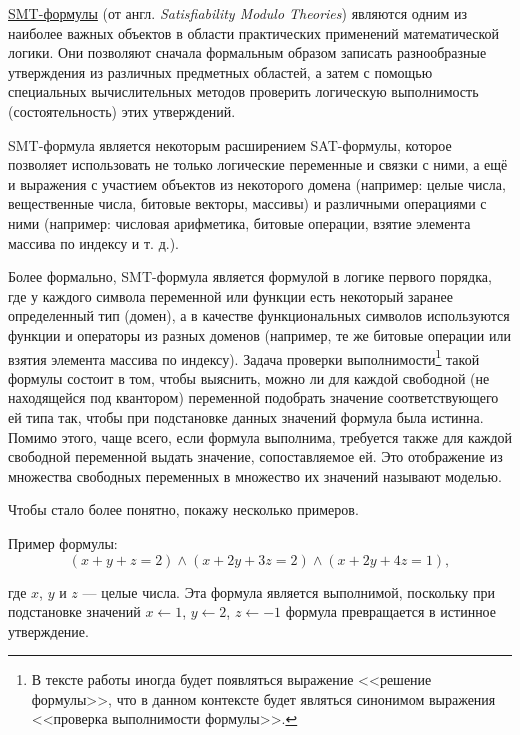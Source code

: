 

\underline{SMT-формулы} (от англ. \textit{Satisfiability Modulo Theories}) являются одним из наиболее важных объектов в области практических применений математической логики. Они позволяют сначала формальным образом записать разнообразные утверждения из различных предметных областей, а затем с помощью специальных вычислительных методов проверить логическую выполнимость (состоятельность) этих утверждений.

SMT-формула является некоторым расширением SAT-формулы, которое позволяет использовать не только логические переменные и связки с ними, а ещё и выражения с участием объектов из некоторого домена (например: целые числа, вещественные числа, битовые векторы, массивы) и различными операциями с ними (например: числовая арифметика, битовые операции, взятие элемента массива по индексу и т. д.).

Более формально, SMT-формула является формулой в логике первого порядка, где у каждого символа переменной или функции есть некоторый заранее определенный тип (домен), а в качестве функциональных символов используются функции и операторы из разных доменов (например, те же битовые операции или взятия элемента массива по индексу). Задача проверки выполнимости\footnote{В тексте работы иногда будет появляться выражение <<решение формулы>>, что в данном контексте будет являться синонимом выражения <<проверка выполнимости формулы>>.} такой формулы состоит в том, чтобы выяснить, можно ли для каждой свободной (не находящейся под квантором) переменной подобрать значение соответствующего ей типа так, чтобы при подстановке данных значений формула была истинна. Помимо этого, чаще всего, если формула выполнима, требуется также для каждой свободной переменной выдать значение, сопоставляемое ей. Это отображение из множества свободных переменных в множество их значений называют моделью.

Чтобы стало более понятно, покажу несколько примеров.

Пример формулы:
\begin{equation} \label{smt-example-1}
    (x + y + z = 2) \wedge (x + 2y + 3z = 2) \wedge (x + 2y + 4z = 1),
\end{equation}

где $x$, $y$ и $z$ --- целые числа. Эта формула является выполнимой, поскольку при подстановке значений $x \leftarrow 1$, $y \leftarrow 2$, $z \leftarrow -1$ формула превращается в истинное утверждение.

